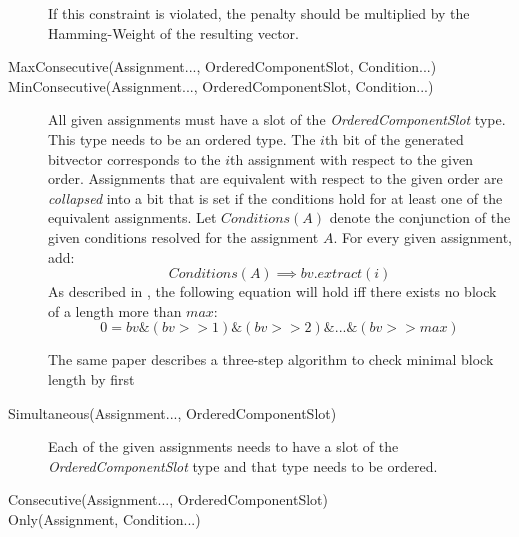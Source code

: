 \begin{description}
If this constraint is violated, the penalty should be multiplied by the Hamming-Weight of the resulting vector.


\item[MaxConsecutive(Assignment..., OrderedComponentSlot, Condition...)]
\item[MinConsecutive(Assignment..., OrderedComponentSlot, Condition...)]

All given assignments must have a slot of the \textit{OrderedComponentSlot} type. This type needs to be an ordered type.
The $i$th bit of the generated bitvector corresponds to the $i$th assignment with respect to the given order. 
Assignments that are equivalent with respect to the given order are \textit{collapsed} into a bit that is set if the conditions hold for at least one of the equivalent assignments.
Let $Conditions(A)$ denote the conjunction of the given conditions resolved for the assignment $A$. For every given assignment, add:
$$ Conditions(A) \implies bv.extract(i) $$
As described in \cite{erkinger2017personnel}, the following equation will hold iff there exists no block of a length more than $max$:
$$0 = bv \& (bv >> 1) \& (bv >> 2) \& . . . \& (bv >> max)$$

The same paper describes a three-step algorithm to check minimal block length by first 

\item[Simultaneous(Assignment..., OrderedComponentSlot)]

Each of the given assignments needs to have a slot of the \textit{OrderedComponentSlot} type and that type needs to be ordered.



\item[Consecutive(Assignment..., OrderedComponentSlot)]

\item[Only(Assignment, Condition...)]



\end{description}


